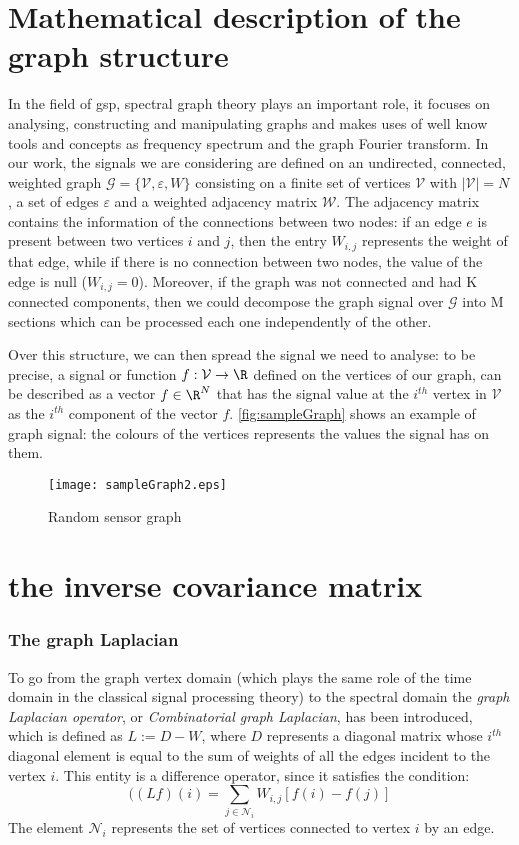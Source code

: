\section{Mathematical description of the graph structure}
In the field of \gls{gsp}, spectral graph theory plays an important role, it focuses on analysing, constructing and manipulating graphs and makes uses of well know tools and concepts as frequency spectrum and the graph Fourier transform. In our work, the signals we are considering are defined on an undirected, connected, weighted graph $\mathcal{G} = \{ \mathcal{V}, \varepsilon, W\}$ consisting on a finite set of vertices $\mathcal{V}$ with $|\mathcal{V}| = N$, a set of edges $\varepsilon$ and a weighted adjacency matrix $\mathcal{W}$. The adjacency matrix contains the information of the connections between two nodes: if an edge $e$ is present between two vertices $i$ and $j$, then the entry $W_{i,j}$ represents the weight of that edge, while if there is no connection between two nodes, the value of the edge is null ($W_{i,j} = 0$). Moreover, if the graph was not connected and had K connected components, then we could decompose the graph signal over $\mathcal{G}$ into M sections which can be processed each one independently of the other.

Over this structure, we can then spread the signal we need to analyse: to be precise, a signal or function $f: \mathcal{V} \to \R$ defined on the vertices of our graph, can be described as a vector $f \in \R^N$ that has the signal value at the $i^{th}$ vertex in $\mathcal{V}$ as the $i^{th}$ component of the vector $f$. \autoref{fig:sampleGraph} shows an example of graph signal: the colours of the vertices represents the values the signal has on them.

\begin{figure}
  \centering
  \texttt{[image: sampleGraph2.eps]}
  \caption{Random sensor graph}
  \label{fig:sampleGraph}
\end{figure}
\section{the inverse covariance matrix}

\subsubsection{The graph Laplacian}
\label{sec:graph laplacian}
To go from the graph vertex domain (which plays the same role of the time domain in the classical signal processing theory) to the spectral domain the \textit{graph Laplacian operator}, or \textit{Combinatorial graph Laplacian}, has been introduced, which is defined as $L := D - W$, where $D$ represents a diagonal matrix whose  $i^{th}$ diagonal element is equal to the sum of weights of all the edges incident to the vertex $i$. This entity is a difference operator, since it satisfies the condition:
\begin{equation}
((L f)(i) = \sum_{j \in \mathcal{N}_i} W_{i,j}[f(i) - f(j)]
\end{equation}
The element $\mathcal{N}_i$ represents the set of vertices connected to vertex $i$ by an edge.

